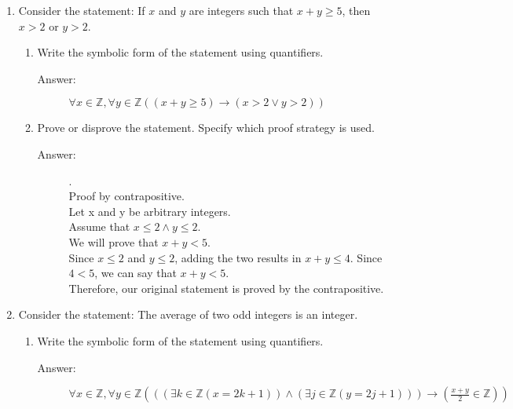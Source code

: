 \documentclass[12pt, oneside]{article}
\begin{document}
\begin{enumerate}
\begin{enumerate}
\end{enumerate}

\quad

\item Consider the statement: If $x$ and $y$ are integers such that $x + y \geq 5$, then $x > 2$ or $y > 2$.
\begin{enumerate}
    \item Write the symbolic form of the statement using quantifiers.
    
    \begin{description}
        \item[Answer:] $\forall x \in \mathbb{Z} , \forall y \in \mathbb{Z} ((x+y \geq 5) \rightarrow (x > 2 \lor y>2))$
    \end{description}
    
    \item Prove or disprove the statement. Specify which proof strategy is used.
    
    \begin{description}
        \item[Answer:] .\\
        Proof by contrapositive. \\
        Let x and y be arbitrary integers. \\
        Assume that $x \leq 2 \land y \leq 2$. \\
        We will prove that $x+y < 5$. \\
        Since $x \leq 2$ and $ y \leq 2$, adding the two results in $x+y \leq 4$.
        Since $4<5$, we can say that $x+y<5$. \\
        Therefore, our original statement is proved by the contrapositive.
    \end{description}

\end{enumerate}

\quad

\item Consider the statement: The average of two odd integers is an integer.
\begin{enumerate}
    \item Write the symbolic form of the statement using quantifiers.
    
    \begin{description}
        \item[Answer:] $\forall x \in \mathbb{Z} , \forall y \in \mathbb{Z} ( ( (\exists k \in \mathbb{Z} (x=2k+1)) \land (\exists j \in \mathbb{Z} (y=2j+1) )) \rightarrow  (\frac{x+y}{2} \in \mathbb{Z} ))$
    \end{description}


\end{enumerate}
\end{enumerate}
\end{document}
